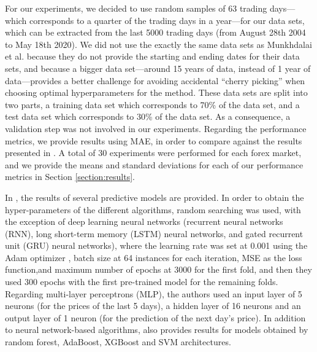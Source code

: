\documentclass{ieeeaccess}
\begin{document}
For our experiments, we decided to use random samples of 63 trading
days---which corresponds to a quarter of the trading days in a
year---for our data sets, which can be extracted from the last 5000
trading days (from August 28th 2004 to May 18th 2020). We did not use
the exactly the same data sets as Munkhdalai et al. because they do
not provide the starting and ending dates for their data sets, and
because a bigger data set---around 15 years of data, instead of 1 year
of data---provides a better challenge for avoiding accidental ``cherry
picking'' \cite{morse2010cherry} when choosing optimal hyperparameters
for the method. %
These data sets
are split into two parts, a training data set which corresponds to
70\% of the data set, and a test data set which corresponds to 30\% of
the data set. As a consequence, a validation step was not involved in
our experiments. Regarding the performance metrics, we provide results
using MAE, in order to compare against the results presented
in \cite{Munkhdalai2019}. A total
of 30 experiments were performed for each forex market, and we provide
the means and standard deviations for each of our performance metrics
in Section \ref{section:results}.

In \cite{Munkhdalai2019}, the results of several predictive models are
provided. In order to obtain the hyper-parameters of the different
algorithms, random searching was used, with the exception of deep
learning neural networks (recurrent neural networks (RNN), long
short-term memory (LSTM) neural networks, and gated recurrent unit
(GRU) neural networks), where the learning rate was set at 0.001 using
the Adam optimizer \cite{kingma2014adam}, batch size at 64 instances
for each iteration, MSE as the loss function,and maximum number of
epochs at 3000 for the first fold, and then they used 300 epochs with
the first pre-trained model for the remaining folds. Regarding
multi-layer perceptrons (MLP), the authors used an input layer of 5 neurons
(for the prices of the last 5 days), a hidden layer of 16 neurons and
an output layer of 1 neuron (for the prediction of the next day's
price). In addition to neural network-based algorithms,
\cite{kingma2014adam} also provides results for models obtained by
random forest, AdaBoost, XGBoost and SVM
architectures.
\end{document}
